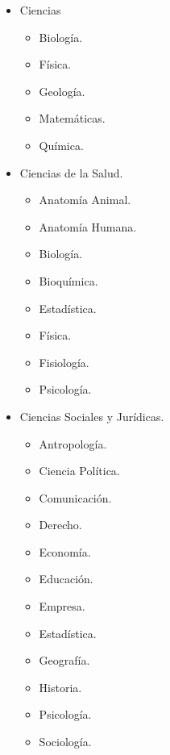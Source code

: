 \begin{enumerate}
\begin{itemize}
\begin{itemize}
                \end{itemize}

            \item Ciencias
                \begin{itemize}

                    \item Biología.

                    \item Física.

                    \item Geología.

                    \item Matemáticas.

                    \item Química.

                \end{itemize}

            \item Ciencias de la Salud.

                \begin{itemize}
                    \item Anatomía Animal.
                    \item Anatomía Humana.
                    \item Biología.
                    \item Bioquímica.
                    \item Estadística.
                    \item Física.
                    \item Fisiología.
                    \item Psicología.
                \end{itemize}

            \item Ciencias Sociales y Jurídicas.
                \begin{itemize}

                    \item Antropología.
                    \item Ciencia Política.
                    \item Comunicación.
                    \item Derecho.
                    \item Economía.
                    \item Educación.
                    \item Empresa.
                    \item Estadística.
                    \item Geografía.
                    \item Historia.
                    \item Psicología.
                    \item Sociología.
                \end{itemize}


\end{itemize}
\end{enumerate}
